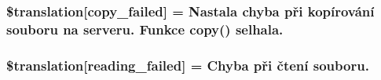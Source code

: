\subsubsection[{\$translation}]{\setlength{\rightskip}{0pt plus 5cm}\$translation\mbox{[}\textquotesingle{}copy\+\_\+failed\textquotesingle{}\mbox{]} = \textquotesingle{}Nastala chyba při kopírování souboru na serveru. Funkce copy() selhala.\textquotesingle{}}\label{class_8upload_8cs___c_s_8php_a783c9358bcf54a054545b50098bc679b}
\hypertarget{class_8upload_8cs___c_s_8php_a01bea14c9fd5f353f62db44beabfcd42}{}
\subsubsection[{\$translation}]{\setlength{\rightskip}{0pt plus 5cm}\$translation\mbox{[}\textquotesingle{}reading\+\_\+failed\textquotesingle{}\mbox{]} = \textquotesingle{}Chyba při čtení souboru.\textquotesingle{}}\label{class_8upload_8cs___c_s_8php_a01bea14c9fd5f353f62db44beabfcd42}
